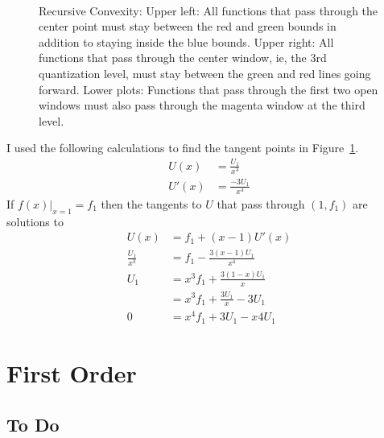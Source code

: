 \documentclass[]{article}
\begin{document}
\begin{figure}
  \centering
    \\
  
    \caption{Recursive Convexity: Upper left: All functions that pass
      through the center point must stay between the red and green
      bounds in addition to staying inside the blue bounds.  Upper
      right: All functions that pass through the center window, ie,
      the 3rd quantization level, must stay between the green and red
      lines going forward.  Lower plots: Functions that pass through
      the first two open windows must also pass through the magenta
      window at the third level.}
  \label{fig:recursive}
\end{figure}

I used the following calculations to find the tangent points in
Figure~\ref{fig:recursive}.
\begin{align*}
  U(x) &= \frac{U_1}{x^3} \\
  U'(x) &= \frac{-3U_1}{x^4}
\end{align*}
If $\left. f(x)\right|_{x=1} = f_1$ then the tangents to $U$ that pass
through $(1, f_1)$ are solutions to
\begin{align*}
  U(x) &= f_1 + (x-1)U'(x) \\
  \frac{U_1}{x^3} &=  f_1 - \frac{3(x-1)U_1}{x^4} \\
  U_1 &= x^3 f_1 + \frac{3(1-x)U_1}{x} \\
  &=  x^3 f_1 + \frac{3U_1}{x} - 3U_1 \\
  0 &= x^4 f_1 + 3U_1 - x4U_1
\end{align*}

\afterpage{\clearpage} %

\newpage
\section{First Order}
\label{sec:first-order}

\subsection{To Do}
\label{sec:do}
\end{document}
